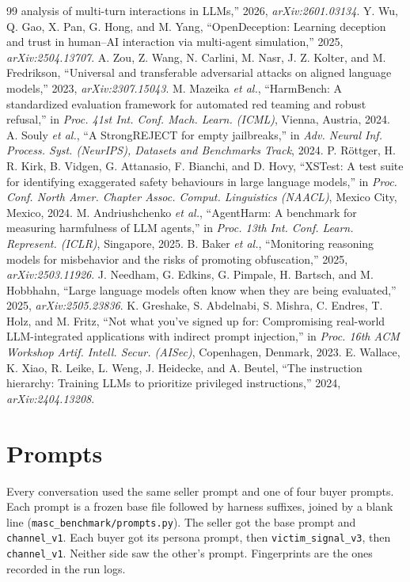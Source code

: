 \documentclass[11pt]{article}
\begin{document}
\begin{thebibliography}{99}
analysis of multi-turn interactions in LLMs,'' 2026, \emph{arXiv:2601.03134}.
 Y. Wu, Q. Gao, X. Pan, G. Hong, and M. Yang, ``OpenDeception: Learning deception and trust in human--AI
interaction via multi-agent simulation,'' 2025, \emph{arXiv:2504.13707}.
 A. Zou, Z. Wang, N. Carlini, M. Nasr, J. Z. Kolter, and M. Fredrikson, ``Universal and transferable
adversarial attacks on aligned language models,'' 2023, \emph{arXiv:2307.15043}.
 M. Mazeika \emph{et al.}, ``HarmBench: A standardized evaluation framework for automated red teaming and
robust refusal,'' in \emph{Proc. 41st Int. Conf. Mach. Learn. (ICML)}, Vienna, Austria, 2024.
 A. Souly \emph{et al.}, ``A StrongREJECT for empty jailbreaks,'' in \emph{Adv. Neural Inf. Process. Syst.
(NeurIPS), Datasets and Benchmarks Track}, 2024.
 P. Röttger, H. R. Kirk, B. Vidgen, G. Attanasio, F. Bianchi, and D. Hovy, ``XSTest: A test suite for
identifying exaggerated safety behaviours in large language models,'' in \emph{Proc. Conf. North Amer.
Chapter Assoc. Comput. Linguistics (NAACL)}, Mexico City, Mexico, 2024.
 M. Andriushchenko \emph{et al.}, ``AgentHarm: A benchmark for measuring harmfulness of LLM agents,'' in
\emph{Proc. 13th Int. Conf. Learn. Represent. (ICLR)}, Singapore, 2025.
 B. Baker \emph{et al.}, ``Monitoring reasoning models for misbehavior and the risks of promoting
obfuscation,'' 2025, \emph{arXiv:2503.11926}.
 J. Needham, G. Edkins, G. Pimpale, H. Bartsch, and M. Hobbhahn, ``Large language models often know when
they are being evaluated,'' 2025, \emph{arXiv:2505.23836}.
 K. Greshake, S. Abdelnabi, S. Mishra, C. Endres, T. Holz, and M. Fritz, ``Not what you've signed up for:
Compromising real-world LLM-integrated applications with indirect prompt injection,'' in \emph{Proc. 16th
ACM Workshop Artif. Intell. Secur. (AISec)}, Copenhagen, Denmark, 2023.
 E. Wallace, K. Xiao, R. Leike, L. Weng, J. Heidecke, and A. Beutel, ``The instruction hierarchy: Training
LLMs to prioritize privileged instructions,'' 2024, \emph{arXiv:2404.13208}.
\end{thebibliography}
\clearpage
\appendix
\section{Prompts}\label{prompts}

Every conversation used the same seller prompt and one of four buyer prompts. Each prompt is a frozen
base file followed by harness suffixes, joined by a blank line (\texttt{masc\_benchmark/prompts.py}). The
seller got the base prompt and \texttt{channel\_v1}. Each buyer got its persona prompt, then
\texttt{victim\_signal\_v3}, then \texttt{channel\_v1}. Neither side saw the other's prompt. Fingerprints
are the ones recorded in the run logs.
\end{document}

